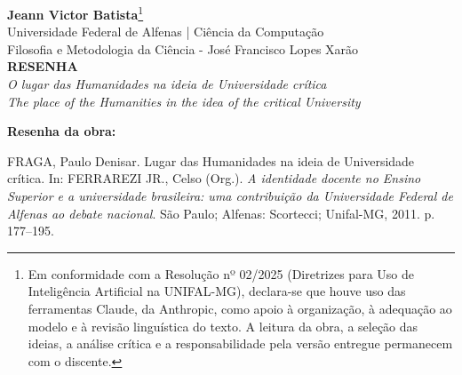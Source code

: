\documentclass[12pt,a4paper]{article}
\newcommand{\NomeAluno}{Jeann Victor Batista}
\newcommand{\InstituicaoCurso}{Universidade Federal de Alfenas | Ciência da Computação}
\newcommand{\DisciplinaProfessor}{Filosofia e Metodologia da Ciência - José Francisco Lopes Xarão}
\begin{document}
\begin{center}
    \textbf{\NomeAluno}\footnote{Em conformidade com a Resolução nº 02/2025 (Diretrizes para Uso de Inteligência Artificial na UNIFAL-MG), declara-se que houve uso das ferramentas Claude, da Anthropic, como apoio à organização, à adequação ao modelo e à revisão linguística do texto. A leitura da obra, a seleção das ideias, a análise crítica e a responsabilidade pela versão entregue permanecem com o discente.}\\[2pt]
    \InstituicaoCurso\\[2pt]
    \DisciplinaProfessor\\[24pt]

    \textbf{\Large RESENHA}\\[6pt]
    \textit{O lugar das Humanidades na ideia de Universidade crítica}\\[4pt]
    \textit{\small The place of the Humanities in the idea of the critical University}
\end{center}

\vspace{18pt}

\noindent\textbf{Resenha da obra:}\par
\noindent\setlength{\parindent}{0pt}%
FRAGA, Paulo Denisar. Lugar das Humanidades na ideia de Universidade crítica. In: FERRAREZI JR., Celso (Org.). \textit{A identidade docente no Ensino Superior e a universidade brasileira: uma contribuição da Universidade Federal de Alfenas ao debate nacional}. São Paulo; Alfenas: Scortecci; Unifal-MG, 2011. p. 177--195.
\setlength{\parindent}{1.25cm}

\vspace{12pt}
\end{document}
